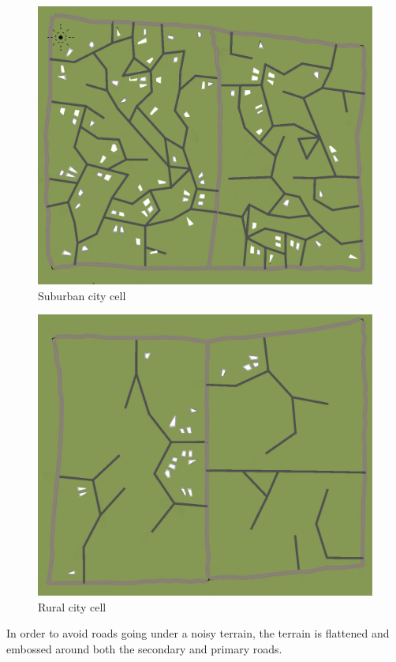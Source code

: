 \documentclass[a4paper,12pt]{scrartcl}
\begin{document}
\begin{figure}[h]
\center
\includegraphics[width=\textwidth]{cellS.png}
\caption{Suburban city cell}
\label{fig:cellS}
\end{figure}

\begin{figure}[h]
\center
\includegraphics[width=\textwidth]{cellR.png}
\caption{Rural city cell}
\label{fig:cellR}
\end{figure}

In order to avoid roads going under a noisy terrain, the terrain is flattened and embossed around both the secondary and primary roads.
\end{document}

